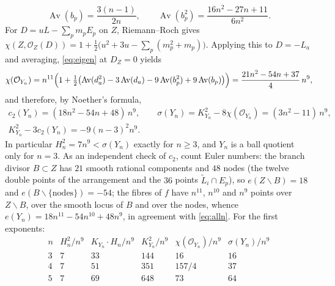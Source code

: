 \documentclass[11pt]{amsart}
\theoremstyle{remark}
\theoremstyle{definition}
\newcommand{\cO}{\mathcal{O}}
\DeclareMathOperator{\Av}{Av}
\begin{document}
\[
\Av(b_p)=\frac{3(n-1)}{2n},\qquad \Av(b_p^2)=\frac{16n^2-27n+11}{6n^2}.
\]
For $D=uL-\sum_pm_pE_p$ on $Z$, Riemann--Roch gives $\chi(Z,\cO_Z(D))=1+\tfrac12\bigl(u^2+3u-\sum_p(m_p^2+m_p)\bigr)$. Applying this to $D=-L_a$ and averaging, \eqref{eq:eigen} at $D_Z=0$ yields
\[
\chi(\cO_{Y_n})=n^{11}\Bigl(1+\tfrac12\bigl(\Av(d_a^2)-3\Av(d_a)-9\Av(b_p^2)+9\Av(b_p)\bigr)\Bigr)=\frac{21n^2-54n+37}{4}\,n^9,
\]
and therefore, by Noether's formula,
\begin{equation}\label{eq:alln}
\begin{gathered}
c_2(Y_n)=(18n^2-54n+48)\,n^9,\qquad \sigma(Y_n)=K_{Y_n}^2-8\chi(\cO_{Y_n})=(3n^2-11)\,n^9,\\
K_{Y_n}^2-3c_2(Y_n)=-9(n-3)^2n^9 .
\end{gathered}
\end{equation}
In particular $H_n^2=7n^9<\sigma(Y_n)$ exactly for $n\ge3$, and $Y_n$ is a ball quotient only for $n=3$. As an independent check of $c_2$, count Euler numbers: the branch divisor $B\subset Z$ has $21$ smooth rational components and $48$ nodes (the twelve double points of the arrangement and the $36$ points $\tilde L_i\cap E_p$), so $e(Z\smallsetminus B)=18$ and $e(B\smallsetminus\{\text{nodes}\})=-54$; the fibres of $f$ have $n^{11}$, $n^{10}$ and $n^9$ points over $Z\smallsetminus B$, over the smooth locus of $B$ and over the nodes, whence $e(Y_n)=18n^{11}-54n^{10}+48n^9$, in agreement with \eqref{eq:alln}. For the first exponents:
\[
\begin{array}{c|ccccc}
n & H_n^2/n^9 & K_{Y_n}\cdot H_n/n^9 & K_{Y_n}^2/n^9 & \chi(\cO_{Y_n})/n^9 & \sigma(Y_n)/n^9\\ \hline
3 & 7 & 33 & 144 & 16 & 16\\
4 & 7 & 51 & 351 & 157/4 & 37\\
5 & 7 & 69 & 648 & 73 & 64
\end{array}
\]
\end{document}
